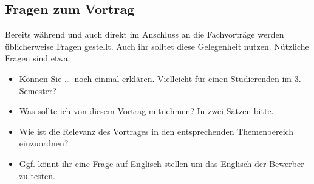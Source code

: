 \subsection{Fragen zum Vortrag}
Bereits während und auch direkt im Anschluss an die Fachvorträge werden üblicherweise Fragen gestellt. Auch ihr solltet diese Gelegenheit nutzen. Nützliche Fragen sind etwa:
\begin{itemize}
    \item Können Sie \dots\ noch einmal erklären. Vielleicht für einen Studierenden im 3. Semester?
    \item Was sollte ich von diesem Vortrag mitnehmen? In zwei Sätzen bitte.
    \item Wie ist die Relevanz des Vortrages in den entsprechenden Themenbereich einzuordnen?
    \item Ggf. könnt ihr eine Frage auf Englisch stellen um das Englisch der Bewerber zu testen.
\end{itemize}

